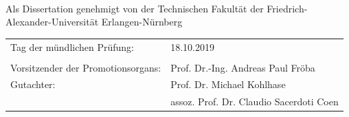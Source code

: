 \documentclass[a4paper,11pt]{book}
\begin{document}
\begin{titlepage}
\begin{center}
\end{center}
\newcommand{\secondpage}{
\pagebreak

\thispagestyle{empty}
\ 

\vfill

\begin{center} Als Dissertation genehmigt von der Technischen Fakultät der Friedrich-Alexander-Universität Erlangen-Nürnberg\end{center}\bigskip

\begin{tabular}{ll}
Tag der mündlichen Prüfung: & 18.10.2019 \\
 & \\
Vorsitzender der Promotionsorgans: & Prof. Dr.-Ing. Andreas Paul Fröba \\
Gutachter: & Prof. Dr. Michael Kohlhase \\
 & assoz. Prof. Dr. Claudio Sacerdoti Coen
\end{tabular}
}

\secondpage

\end{titlepage}




\cleardoublepage



\newpage\tableofcontents\tableofednotes%

\end{document}
